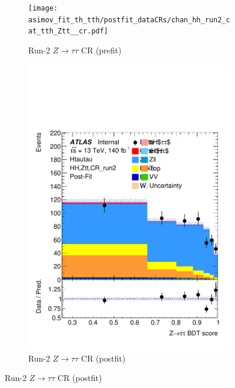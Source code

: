 \begin{figure}[h]
  \centering
  \begin{subfigure}[t]{0.45\textwidth}
    \centering
    \texttt{[image: asimov\_fit\_th\_tth/postfit\_dataCRs/chan\_hh\_run2\_cat\_tth\_Ztt\_\_cr.pdf]}
    \caption{Run-2 $Z\to\tau\tau$ CR (prefit)}
  \end{subfigure}
  \hfill
  \begin{subfigure}[t]{0.45\textwidth}
    \centering
    \includegraphics[width=\linewidth]{images/asimov_fit_th_tth/postfit_dataCRs/chan_hh_run2_cat_tth_Ztt__cr_postFit.pdf}
    \caption{Run-2 $Z\to\tau\tau$ CR (postfit)}
  \end{subfigure}

  \vspace{0.4cm}


\end{figure}
